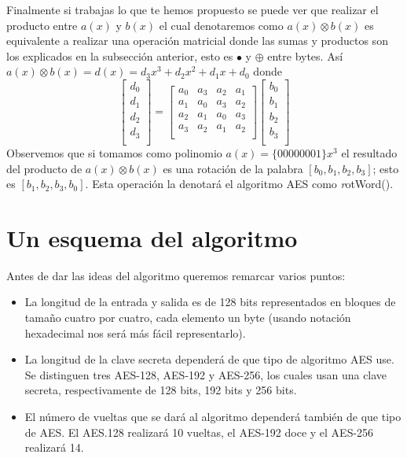 Finalmente si trabajas lo que te hemos propuesto se puede ver que realizar el producto entre $a(x)$ y $b(x)$ el cual denotaremos como $a(x)\otimes b(x)$ es equivalente a realizar una operación matricial donde las sumas y productos son los explicados en la subsección anterior, esto es $\bullet$ y $\oplus$ entre bytes. Así \mbox{$a(x)\otimes b(x)=d(x)=d_3x^3+d_2 x^2+d_1 x+d_0$} donde
$$
\left[
\begin{array}{c}
d_0\\
d_1\\
d_2\\
d_3\\
\end{array}
\right]=\left[
\begin{array}{cccc}
a_0 & a_3 & a_2 & a_1\\
a_1 & a_0 & a_3 & a_2\\
a_2 & a_1 & a_0 & a_3\\
a_3 & a_2 & a_1 & a_2\\
\end{array}
\right]\left[
\begin{array}{c}
b_0\\
b_1\\
b_2\\
b_3\\
\end{array}
\right]
$$
Observemos que si tomamos como polinomio $a(x)=\{00000001\}x^3$ el resultado del producto de $a(x)\otimes b(x)$ es una rotación de la palabra $[b_0, b_1,b_2,b_3]$; esto es $[b_1, b_2,b_3,b_0]$. Esta operación la denotará el algoritmo AES como {\textsl rotWord()}.
\section{Un esquema del algoritmo}

Antes de dar las ideas del algoritmo queremos remarcar varios puntos:
\begin{itemize}
\item La longitud de la entrada y salida es de 128 bits representados en bloques de tamaño cuatro por cuatro, cada elemento un byte (usando notación hexadecimal nos será más fácil representarlo).
\item La longitud de la clave secreta dependerá de que tipo de algoritmo AES use. Se distinguen tres AES-128, AES-192 y AES-256, los cuales usan una clave secreta, respectivamente de 128 bits, 192 bits y 256 bits.
\item El número de vueltas que se dará al algoritmo dependerá  también de que tipo de AES. El AES.128 realizará 10 vueltas, el AES-192 doce y el AES-256 realizará 14.
\end{itemize}

